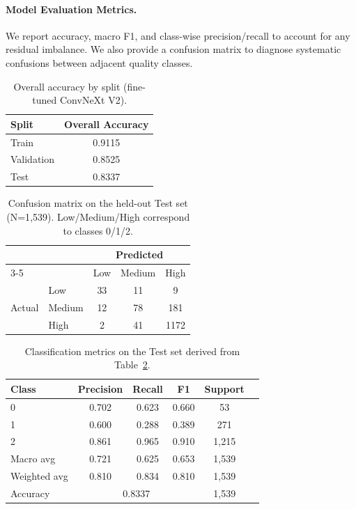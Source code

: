\paragraph{Model Evaluation Metrics.} We report accuracy, macro F1, and class-wise precision/recall to account for any residual imbalance. We also provide a confusion matrix to diagnose systematic confusions between adjacent quality classes.

\begin{table}[h!]
    \centering
    \caption{Overall accuracy by split (fine-tuned ConvNeXt V2).}
    \begin{tabular}{l c}
        \hline
        Split & Overall Accuracy \\
        \hline
        Train & 0.9115 \\
        Validation & 0.8525 \\
        Test & 0.8337 \\
        \hline
    \end{tabular}
    \label{tab:overall_acc_tiny}
\end{table}

\begin{table}[h!]
  \centering
  \caption{Confusion matrix on the held-out Test set (N=1{,}539). Low/Medium/High correspond to classes 0/1/2.}
  \small
  \begin{tabular}{llccc}
    \toprule
    & & \multicolumn{3}{c}{Predicted} \\
    \cmidrule(lr){3-5}
    & & Low & Medium & High \\
    \midrule
    \multirow{3}{*}{Actual} & Low    & 33 & 11 &  9 \\
                          & Medium & 12 & 78 & 181 \\
                          & High   &  2 & 41 & 1172 \\
    \bottomrule
  \end{tabular}
  \label{tab:rq_confmat_test}
\end{table}


\begin{table}[h!]
    \centering
    \small
    \caption{Classification metrics on the Test set derived from Table~\ref{tab:rq_confmat_test}.}
    \begin{tabular}{lccccr}
        \toprule
        Class & Precision & Recall & F1 & Support \\
        \midrule
        0 & 0.702 & 0.623 & 0.660 & 53 \\
        1 & 0.600 & 0.288 & 0.389 & 271 \\
        2 & 0.861 & 0.965 & 0.910 & 1{,}215 \\
        \midrule
        Macro avg   & 0.721 & 0.625 & 0.653 & 1{,}539 \\
        Weighted avg& 0.810 & 0.834 & 0.810 & 1{,}539 \\
        \midrule
        Accuracy    & \multicolumn{3}{c}{0.8337} & 1{,}539 \\
        \bottomrule
    \end{tabular}
    \label{tab:rq_cls_report_test}
\end{table}

